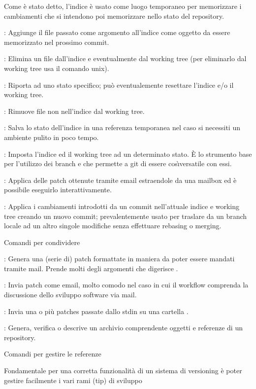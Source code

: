 Come \`e stato detto, l'indice \`e usato come luogo temporaneo per memorizzare i
cambiamenti che si intendono poi memorizzare nello stato del repository.

\elemento{}: Aggiunge il file passato come argomento all'indice come
oggetto da essere memorizzato nel prossimo commit.

\elemento{}: Elimina un file dall'indice e eventualmente dal working tree
(per eliminarlo dal working tree usa il comando  unix).

\elemento{}: Riporta  ad uno stato specifico; pu\`o
eventualemente resettare l'indice e/o il working tree.

\elemento{}: Rimuove file non nell'indice dal working tree.

\elemento{}: Salva lo stato dell'indice in una referenza temporanea
nel caso si necessiti un ambiente pulito in poco tempo.

\elemento{}: Imposta l'indice ed il working tree ad un determinato 
stato. \`E lo strumento base per l'utilizzo dei branch e che permette a git di
essere cos\`\i versatile con essi.

\elemento{}: Applica delle patch ottenute tramite email estraendole da
una mailbox ed \`e possibile eseguirlo interattivamente.

\elemento{}: Applica i cambiamenti introdotti da un commit
nell'attuale indice e working tree creando un nuovo commit; prevalentemente
usato per traslare da un branch locale ad un altro singole modifiche senza
effettuare rebasing o merging.

\sezione Comandi per condividere

\elemento{}: Genera una (serie di) patch formattate in
maniera da poter essere mandati tramite mail. Prende molti degli argomenti che
digerisce .

\elemento{}: Invia patch come email, molto comodo nel caso in cui
il workflow comprenda la discussione dello sviluppo software via mail.

\elemento{}: Invia una o pi\`u patches passate dallo stdin su una
cartella .

\elemento{}: Genera, verifica o descrive un archivio comprendente
oggetti e referenze di un repository.

\sezione Comandi per gestire le referenze

Fondamentale per una corretta funzionalit\`a di un sistema di versioning \`e
poter gestire facilmente i vari rami (tip) di sviluppo

